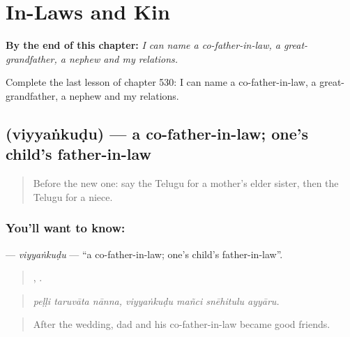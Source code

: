 
\chapter{In-Laws and Kin}
\label{ch:te-in-laws-and-kin}

\begin{chapteropening}
\textbf{By the end of this chapter:} \emph{I can name a co-father-in-law, a great-grandfather, a nephew and my relations.}

Complete the last lesson of chapter 530: I can name a co-father-in-law, a great-grandfather, a nephew and my relations.
\end{chapteropening}

\section[\texorpdfstring{\te{వియ్యంకుడు} (viyyaṅkuḍu)}{వియ్యంకుడు (viyyaṅkuḍu)}]{ (viyyaṅkuḍu) — a co-father-in-law; one's child's father-in-law}

\label{lesson:TE-C530-viyyankudu}



\begin{quote}
Before the new one: say the Telugu for a mother's elder sister, then the Telugu for a niece.
\end{quote}

\subsection*{You'll want to know: }
\textbf{} — \emph{viyyaṅkuḍu} — \textquotedblleft{}a co-father-in-law; one's child's father-in-law\textquotedblright{}.

\begin{quote}
  ,    .
\end{quote}

\begin{quote}
\emph{peḷḷi taruvāta nānna, viyyaṅkuḍu mañci snēhitulu ayyāru.}
\end{quote}

\begin{quote}
After the wedding, dad and his co-father-in-law became good friends.
\end{quote}

